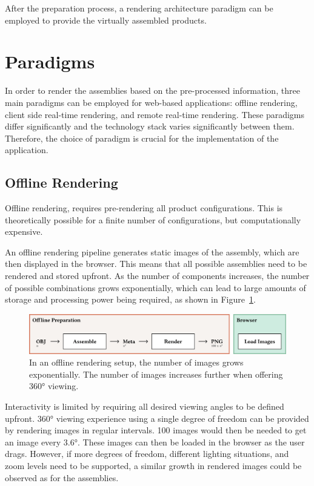 After the preparation process, a rendering architecture paradigm can be employed to provide the virtually assembled products.

\section{Paradigms}

In order to render the assemblies based on the pre-processed information, three main paradigms can be employed for web-based applications: offline rendering, client side real-time rendering, and remote real-time rendering. These paradigms differ significantly and the technology stack varies significantly between them. Therefore, the choice of paradigm is crucial for the implementation of the application.

\subsection*{Offline Rendering}

Offline rendering, requires pre-rendering all product configurations. This is theoretically possible for a finite number of configurations, but computationally expensive. 

An offline rendering pipeline generates static images of the assembly, which are then displayed in the browser. This means that all possible assemblies need to be rendered and stored upfront. As the number of components increases, the number of possible combinations grows exponentially, which can lead to large amounts of storage and processing power being required, as shown in Figure~\ref{fig:cad-offline}.

\begin{figure}[H]
  \includegraphics[width=\columnwidth]{resources/cad-pipeline-offline.png}
  \caption{In an offline rendering setup, the number of images grows exponentially. The number of images increases further when offering 360° viewing.}
  \label{fig:cad-offline}
\end{figure}

Interactivity is limited by requiring all desired viewing angles to be defined upfront. 360° viewing experience using a single degree of freedom can be provided by rendering images in regular intervals. 100 images would then be needed to get an image every 3.6°. These images can then be loaded in the browser as the user drags. However, if more degrees of freedom, different lighting situations, and zoom levels need to be supported, a similar growth in rendered images could be observed as for the assemblies.

